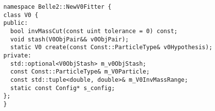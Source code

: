 \begin{verbatim}
namespace Belle2::NewV0Fitter {
class V0 {
public:
  bool invMassCut(const uint tolerance = 0) const;
  void stash(V0ObjPair&& v0ObjPair);
  static V0 create(const Const::ParticleType& v0Hypothesis);
private:
  std::optional<V0ObjStash> m_v0ObjStash;
  const Const::ParticleType& m_V0Particle;
  const std::tuple<double, double>& m_V0InvMassRange;
  static const Config* s_config;
};
}
\end{verbatim}  
